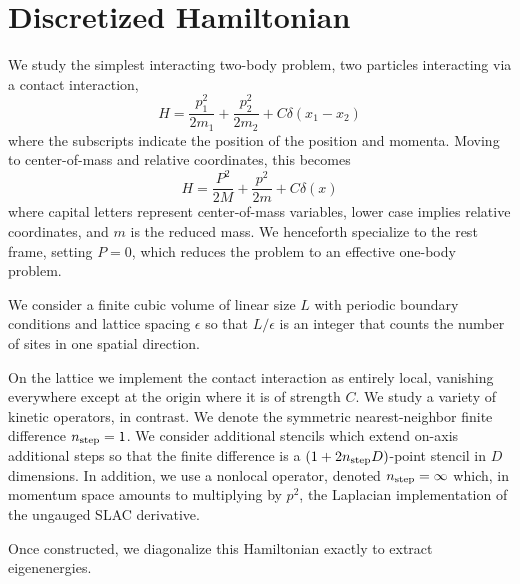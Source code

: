 \section{Discretized Hamiltonian}\label{sec:hamiltonian}

We study the simplest interacting two-body problem, two particles interacting via a contact interaction,
\begin{equation}
    H = \frac{p_1^2}{2 m_1} + \frac{p_2^2}{2 m_2} + C \delta(x_1-x_2)
\end{equation}
where the subscripts indicate the position of the position and momenta.  Moving to center-of-mass and relative coordinates, this becomes
\begin{equation}
    H = \frac{P^2}{2 M} + \frac{p^2}{2 m} + C \delta(x)
\end{equation}
where capital letters represent center-of-mass variables, lower case implies relative coordinates, and $m$ is the reduced mass.  We henceforth specialize to the rest frame, setting $P=0$, which reduces the problem to an effective one-body problem.

We consider a finite cubic volume of linear size $L$ with periodic boundary conditions and lattice spacing $\epsilon$ so that $L/\epsilon$ is an integer that counts the number of sites in one spatial direction.

On the lattice we implement the contact interaction as entirely local, vanishing everywhere except at the origin where it is of strength $C$.  We study a variety of kinetic operators, in contrast.  We denote the symmetric nearest-neighbor finite difference $n_\text{step}=1$.  We consider additional stencils which extend on-axis additional steps so that the finite difference is a $(1+2n_\text{step} D)$-point stencil in $D$ dimensions.  In addition, we use a nonlocal operator, denoted $n_\text{step}=\infty$ which, in momentum space amounts to multiplying by $p^2$, the Laplacian implementation of the ungauged SLAC derivative.

Once constructed, we diagonalize this Hamiltonian exactly to extract eigenenergies.
